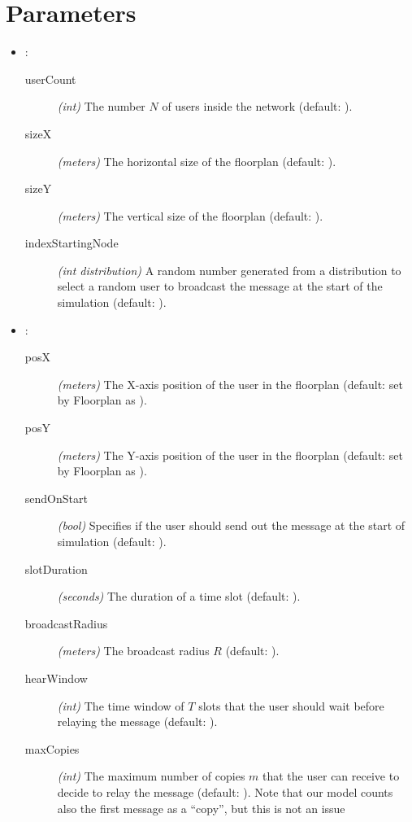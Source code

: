 \section{Parameters}\label{sec:parameters}

\begin{itemize}
	\item {}:
		\begin{description}
			\item[userCount] \textit{(int)} The number \(N\) of
				users inside the network (default: ).
			\item[sizeX] \textit{(meters)} The horizontal size of
				the floorplan (default: ).
			\item[sizeY] \textit{(meters)} The vertical size of the
				floorplan (default: ).
			\item[indexStartingNode] \textit{(int distribution)} A
				random number generated from a distribution to
				select a random user to broadcast the message at
				the start of the simulation (default:
				).
		\end{description}
	\item {}:
		\begin{description}
			\item[posX] \textit{(meters)} The X-axis position of the
				user in the floorplan (default: set by Floorplan
				as ).
			\item[posY] \textit{(meters)} The Y-axis position of the
				user in the floorplan (default: set by Floorplan
				as ).
			\item[sendOnStart] \textit{(bool)} Specifies if the user
				should send out the message at the start of
				simulation (default: ).
			\item[slotDuration] \textit{(seconds)} The duration of a
				time slot (default: ).
			\item[broadcastRadius] \textit{(meters)} The broadcast
				radius \(R\) (default: ).
			\item[hearWindow] \textit{(int)} The time window of
				\(T\) slots that the user should wait before
				relaying the message (default: ).
			\item[maxCopies] \textit{(int)} The maximum number of
				copies \(m\) that the user can receive to
				decide to relay the message (default: ).
				Note that our model counts also the first
				message as a ``copy'', but this is not an issue

\end{description}
\end{itemize}
